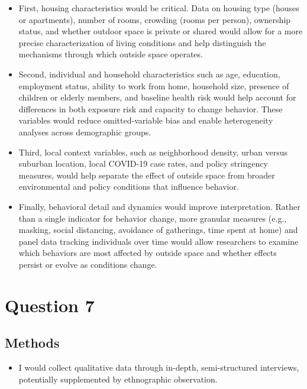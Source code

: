 \documentclass[
  letterpaper,
  DIV=11,
  numbers=noendperiod]{scrartcl}
\providecommand{\tightlist}{%
  \setlength{\itemsep}{0pt}\setlength{\parskip}{0pt}}
\begin{document}
\begin{itemize}
\item
  First, housing characteristics would be critical. Data on housing type
  (houses or apartments), number of rooms, crowding (rooms per person),
  ownership status, and whether outdoor space is private or shared would
  allow for a more precise characterization of living conditions and
  help distinguish the mechanisms through which outside space operates.
\item
  Second, individual and household characteristics such as age,
  education, employment status, ability to work from home, household
  size, presence of children or elderly members, and baseline health
  risk would help account for differences in both exposure risk and
  capacity to change behavior. These variables would reduce
  omitted-variable bias and enable heterogeneity analyses across
  demographic groups.
\item
  Third, local context variables, such as neighborhood density, urban
  versus suburban location, local COVID-19 case rates, and policy
  stringency measures, would help separate the effect of outside space
  from broader environmental and policy conditions that influence
  behavior.
\item
  Finally, behavioral detail and dynamics would improve interpretation.
  Rather than a single indicator for behavior change, more granular
  measures (e.g., masking, social distancing, avoidance of gatherings,
  time spent at home) and panel data tracking individuals over time
  would allow researchers to examine which behaviors are most affected
  by outside space and whether effects persist or evolve as conditions
  change.
\end{itemize}

\section{Question 7}\label{question-7}

\subsection{Methods}\label{methods}

\begin{itemize}
\tightlist
\item
  I would collect qualitative data through in-depth, semi-structured
  interviews, potentially supplemented by ethnographic observation.
\end{itemize}
\end{document}

